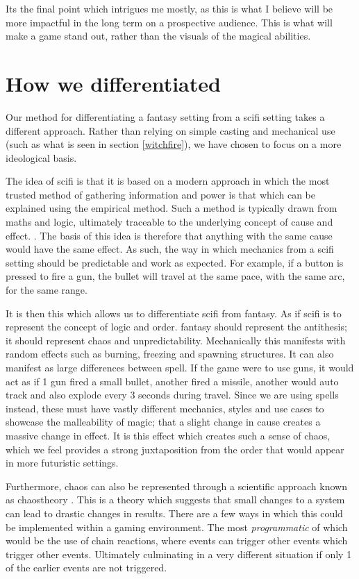 \documentclass[12pt,a4paper]{report}
\begin{document}
Its the final point which intrigues me mostly, as this is what I believe will be more impactful in the long term on a prospective audience. This is what will make a game stand out, rather than the visuals of the magical abilities.

\section{How we differentiated} \label{method1}

Our method for differentiating a \gls{fantasy} setting from a \gls{scifi} setting takes a different approach. Rather than relying on simple casting and mechanical use (such as what is seen in section \ref{witchfire}), we have chosen to focus on a more ideological basis.

The idea of \gls{scifi} is that it is based on a modern approach in which the most trusted method of gathering information and power is that which can be explained using the empirical method. Such a method is typically drawn from maths and logic, ultimately traceable to the underlying concept of cause and effect. \parencite{creath2011logical}. The basis of this idea is therefore that anything with the same cause would have the same effect. As such, the way in which mechanics from a \gls{scifi} setting should be predictable and work as expected. For example, if a button is pressed to fire a gun, the bullet will travel at the same pace, with the same arc, for the same range.

It is then this which allows us to differentiate \gls{scifi} from \gls{fantasy}. As if \gls{scifi} is to represent the concept of logic and order. \gls{fantasy} should represent the antithesis; it should represent chaos and unpredictability. Mechanically this manifests with random effects such as burning, freezing and spawning structures. It can also manifest as large differences between spell. If the game were to use guns, it would act as if 1 gun fired a small bullet, another fired a missile, another would auto track and also explode every 3 seconds during travel. Since we are using spells instead, these must have vastly different mechanics, styles and use cases to showcase the malleability of magic; that a slight change in cause creates a massive change in effect. It is this effect which creates such a sense of chaos, which we feel provides a strong juxtaposition from the order that would appear in more futuristic settings.

Furthermore, chaos can also be represented through a scientific approach known as \gls{chaostheory} \parencite{lorenz2004deterministic}. This is a theory which suggests that small changes to a system can lead to drastic changes in results. There are a few ways in which this could be implemented within a gaming environment. The most \textit{programmatic} of which would be the use of chain reactions, where events can trigger other events which trigger other events. Ultimately culminating in a very different situation if only 1 of the earlier events are not triggered.
\end{document}
